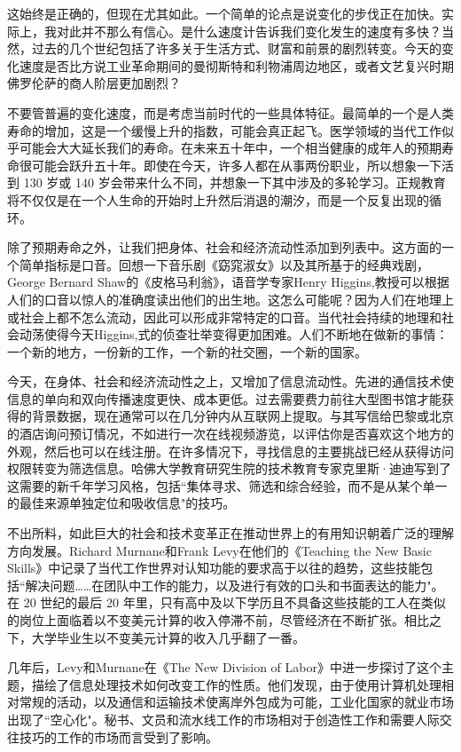 这始终是正确的，但现在尤其如此。一个简单的论点是说变化的步伐正在加快。实际上，我对此并不那么有信心。是什么速度计告诉我们变化发生的速度有多快？当然，过去的几个世纪包括了许多关于生活方式、财富和前景的剧烈转变。今天的变化速度是否比方说工业革命期间的曼彻斯特和利物浦周边地区，或者文艺复兴时期佛罗伦萨的商人阶层更加剧烈？

不要管普遍的变化速度，而是考虑当前时代的一些具体特征。最简单的一个是人类寿命的增加，这是一个缓慢上升的指数，可能会真正起飞。医学领域的当代工作似乎可能会大大延长我们的寿命。在未来五十年中，一个相当健康的成年人的预期寿命很可能会跃升五十年。即使在今天，许多人都在从事两份职业，所以想象一下活到 130 岁或 140 岁会带来什么不同，并想象一下其中涉及的多轮学习。正规教育将不仅仅是在一个人生命的开始时上升然后消退的潮汐，而是一个反复出现的循环。

除了预期寿命之外，让我们把身体、社会和经济流动性添加到列表中。这方面的一个简单指标是口音。回想一下音乐剧《窈窕淑女》以及其所基于的经典戏剧，George Bernard Shaw的《皮格马利翁》，语音学专家Henry Higgins,教授可以根据人们的口音以惊人的准确度读出他们的出生地。这怎么可能呢？因为人们在地理上或社会上都不怎么流动，因此可以形成非常特定的口音。当代社会持续的地理和社会动荡使得今天Higgins,式的侦查壮举变得更加困难。人们不断地在做新的事情：一个新的地方，一份新的工作，一个新的社交圈，一个新的国家。

今天，在身体、社会和经济流动性之上，又增加了信息流动性。先进的通信技术使信息的单向和双向传播速度更快、成本更低。过去需要费力前往大型图书馆才能获得的背景数据，现在通常可以在几分钟内从互联网上提取。与其写信给巴黎或北京的酒店询问预订情况，不如进行一次在线视频游览，以评估你是否喜欢这个地方的外观，然后也可以在线注册。在许多情况下，寻找信息的主要挑战已经从获得访问权限转变为筛选信息。哈佛大学教育研究生院的技术教育专家克里斯·迪迪写到了这需要的新千年学习风格，包括``集体寻求、筛选和综合经验，而不是从某个单一的最佳来源单独定位和吸收信息"的技巧。

不出所料，如此巨大的社会和技术变革正在推动世界上的有用知识朝着广泛的理解方向发展。Richard Murnane和Frank Levy在他们的《Teaching the New Basic Skills》中记录了当代工作世界对认知功能的要求高于以往的趋势，这些技能包括``解决问题……在团队中工作的能力，以及进行有效的口头和书面表达的能力"。在 20 世纪的最后 20 年里，只有高中及以下学历且不具备这些技能的工人在类似的岗位上面临着以不变美元计算的收入停滞不前，尽管经济在不断扩张。相比之下，大学毕业生以不变美元计算的收入几乎翻了一番。

几年后，Levy和Murnane在《The New Division of Labor》中进一步探讨了这个主题，描绘了信息处理技术如何改变工作的性质。他们发现，由于使用计算机处理相对常规的活动，以及通信和运输技术使离岸外包成为可能，工业化国家的就业市场出现了``空心化"。秘书、文员和流水线工作的市场相对于创造性工作和需要人际交往技巧的工作的市场而言受到了影响。

